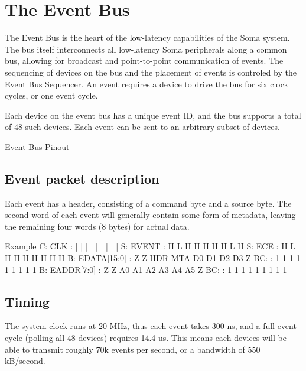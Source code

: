 
\section{The Event Bus}

The Event Bus is the heart of the low-latency capabilities of the Soma system. The bus itself interconnects all low-latency Soma peripherals along a common bus, allowing for broadcast and point-to-point communication of events. The sequencing of devices on the bus and the placement of events is controled by the Event Bus Sequencer. An event requires a device to drive the bus for six clock cycles, or one event cycle. 

      Each device on the event bus has a unique event ID, and the bus supports a total of 48 such devices. Each event can be sent to an arbitrary subset of devices.  

\begin{SignalTable}{Event Bus Pinout}





\end{SignalTable}


\subsection{Event packet description}

Each event has a header, consisting of a command byte and a source byte. The second word of each event will generally contain some form of metadata, leaving the remaining four words (8 bytes) for actual data.

\begin{timing}{Example}
C: CLK		:  |   |   |   |   |   |   |   |   | 
S: EVENT	:  H   L   H   H   H   H   H   L   H
S: ECE		:  H   L   H   H   H   H   H   H   H 
B: EDATA[15:0]	:  Z   Z   HDR MTA D0  D1  D2  D3  Z
BC:             :  1   1   1   1   1   1   1   1   1
B: EADDR[7:0]   :  Z   Z   A0  A1  A2  A3  A4  A5  Z
BC:             :  1   1   1   1   1   1   1   1   1 
\end{timing}

\subsection{Timing}
The system clock runs at 20 MHz, thus each event takes 300 ns, and a full event cycle (polling all 48 devices) requires 14.4 us. This means each devices will be able to transmit roughly 70k events per second, or a bandwidth of 550 kB/second. 
